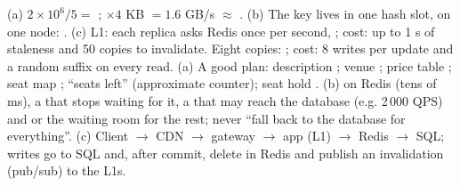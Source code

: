  (a) $2 \times 10^6 / 5 =$ ; $\times 4$ KB $= 1.6$ GB/s $\approx$ . (b) The key lives in one hash slot, on one node: . (c) L1: each replica asks Redis once per second, ; cost: up to 1 s of staleness and 50 copies to invalidate. Eight copies: ; cost: 8 writes per update and a random suffix on every read.
 (a) A good plan: description ; venue ; price table ; seat map ; ``seats left''  (approximate counter); seat hold . (b)  on Redis (tens of ms), a  that stops waiting for it, a  that may reach the database (e.g. 2\,000 QPS) and  or the waiting room for the rest; never ``fall back to the database for everything''. (c) Client $\to$ CDN $\to$ gateway $\to$ app (L1) $\to$ Redis $\to$ SQL; writes go to SQL and, after commit, delete in Redis and publish an invalidation (pub/sub) to the L1s.
